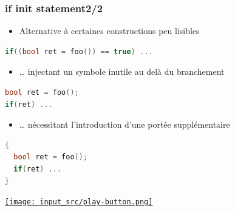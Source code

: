 \documentclass[C++.tex]{subfiles}
\begin{document}
\begin{frame}[fragile]
	\frametitle{if init statement\titlehfill{}2/2}
	\begin{itemize}
		\item Alternative à certaines constructions peu lisibles
	\end{itemize}

	\begin{lstlisting}[language=C++]
if((bool ret = foo()) == true) ...\end{lstlisting}

	\begin{itemize}
		\item \ldots{} injectant un symbole inutile au delà du branchement
	\end{itemize}

	\begin{lstlisting}[language=C++]
bool ret = foo();
if(ret) ...\end{lstlisting}

	\begin{itemize}
		\item \ldots{} nécessitant l'introduction d'une portée supplémentaire
	\end{itemize}

	\begin{lstlisting}[language=C++]
{
  bool ret = foo();
  if(ret) ...
}\end{lstlisting}

	\hfill
	\href{https://godbolt.org/#g:!((g:!((g:!((h:codeEditor,i:(filename:'1',fontScale:14,fontUsePx:'0',j:1,lang:c%2B%2B,selection:(endColumn:1,endLineNumber:19,positionColumn:1,positionLineNumber:19,selectionStartColumn:1,selectionStartLineNumber:19,startColumn:1,startLineNumber:19),source:'%23include+%3Ciostream%3E%0A%0Aint+main()%0A%7B%0A++%7B%0A++++int+bar+%3D+5%3B%0A%0A++++if(int+foo+%3D+42%3B+bar)%0A++++%7B%0A++++++std::cout+%3C%3C+foo+%3C%3C+!'%5Cn!'%3B%0A++++%7D%0A++++else%0A++++%7B%0A++++++std::cout+%3C%3C+-foo+%3C%3C+!'%5Cn!'%3B%0A++++%7D%0A++%7D%0A%0A%7D%0A'),l:'5',n:'0',o:'C%2B%2B+source+%231',t:'0')),k:50,l:'4',n:'0',o:'',s:0,t:'0'),(g:!((h:executor,i:(argsPanelShown:'1',compilationPanelShown:'0',compiler:g112,compilerOutShown:'0',execArgs:'',execStdin:'',fontScale:14,fontUsePx:'0',j:1,lang:c%2B%2B,libs:!((name:boost,ver:'175')),options:'-std%3Dc%2B%2B17',source:1,stdinPanelShown:'1',tree:'1',wrap:'0'),l:'5',n:'0',o:'Executor+x86-64+gcc+11.2+(C%2B%2B,+Editor+%231)',t:'0')),header:(),k:50,l:'4',n:'0',o:'',s:0,t:'0')),l:'2',n:'0',o:'',t:'0')),version:4}{\texttt{[image: input\_src/play-button.png]}}
\end{frame}
\end{document}
